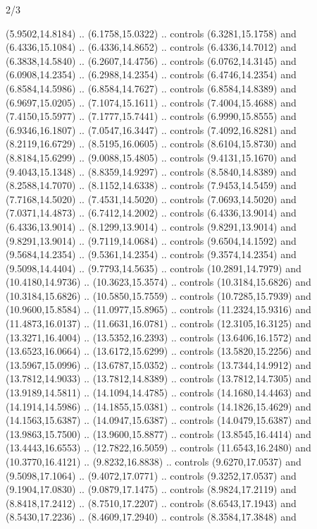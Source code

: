 \begin{flagdescription}{2/3}
\begin{scope}[yshift=\flagwidth,scale=\flagwidth/1241.93737]
\begin{scope}[y=-1mm, x=1mm,draw=gold,fill=blue,line join=miter,miter limit=4,line width=1.8\lw]
{  (5.9502,14.8184) .. (6.1758,15.0322) .. controls (6.3281,15.1758) and
  (6.4336,15.1084) .. (6.4336,14.8652) .. controls (6.4336,14.7012) and
  (6.3838,14.5840) .. (6.2607,14.4756) .. controls (6.0762,14.3145) and
  (6.0908,14.2354) .. (6.2988,14.2354) .. controls (6.4746,14.2354) and
  (6.8584,14.5986) .. (6.8584,14.7627) .. controls (6.8584,14.8389) and
  (6.9697,15.0205) .. (7.1074,15.1611) .. controls (7.4004,15.4688) and
  (7.4150,15.5977) .. (7.1777,15.7441) .. controls (6.9990,15.8555) and
  (6.9346,16.1807) .. (7.0547,16.3447) .. controls (7.4092,16.8281) and
  (8.2119,16.6729) .. (8.5195,16.0605) .. controls (8.6104,15.8730) and
  (8.8184,15.6299) .. (9.0088,15.4805) .. controls (9.4131,15.1670) and
  (9.4043,15.1348) .. (8.8359,14.9297) .. controls (8.5840,14.8389) and
  (8.2588,14.7070) .. (8.1152,14.6338) .. controls (7.9453,14.5459) and
  (7.7168,14.5020) .. (7.4531,14.5020) .. controls (7.0693,14.5020) and
  (7.0371,14.4873) .. (6.7412,14.2002) .. controls (6.4336,13.9014) and
  (6.4336,13.9014) .. (8.1299,13.9014) .. controls (9.8291,13.9014) and
  (9.8291,13.9014) .. (9.7119,14.0684) .. controls (9.6504,14.1592) and
  (9.5684,14.2354) .. (9.5361,14.2354) .. controls (9.3574,14.2354) and
  (9.5098,14.4404) .. (9.7793,14.5635) .. controls (10.2891,14.7979) and
  (10.4180,14.9736) .. (10.3623,15.3574) .. controls (10.3184,15.6826) and
  (10.3184,15.6826) .. (10.5850,15.7559) .. controls (10.7285,15.7939) and
  (10.9600,15.8584) .. (11.0977,15.8965) .. controls (11.2324,15.9316) and
  (11.4873,16.0137) .. (11.6631,16.0781) .. controls (12.3105,16.3125) and
  (13.3271,16.4004) .. (13.5352,16.2393) .. controls (13.6406,16.1572) and
  (13.6523,16.0664) .. (13.6172,15.6299) .. controls (13.5820,15.2256) and
  (13.5967,15.0996) .. (13.6787,15.0352) .. controls (13.7344,14.9912) and
  (13.7812,14.9033) .. (13.7812,14.8389) .. controls (13.7812,14.7305) and
  (13.9189,14.5811) .. (14.1094,14.4785) .. controls (14.1680,14.4463) and
  (14.1914,14.5986) .. (14.1855,15.0381) .. controls (14.1826,15.4629) and
  (14.1563,15.6387) .. (14.0947,15.6387) .. controls (14.0479,15.6387) and
  (13.9863,15.7500) .. (13.9600,15.8877) .. controls (13.8545,16.4414) and
  (13.4443,16.6553) .. (12.7822,16.5059) .. controls (11.6543,16.2480) and
  (10.3770,16.4121) .. (9.8232,16.8838) .. controls (9.6270,17.0537) and
  (9.5098,17.1064) .. (9.4072,17.0771) .. controls (9.3252,17.0537) and
  (9.1904,17.0830) .. (9.0879,17.1475) .. controls (8.9824,17.2119) and
  (8.8418,17.2412) .. (8.7510,17.2207) .. controls (8.6543,17.1943) and
  (8.5430,17.2236) .. (8.4609,17.2940) .. controls (8.3584,17.3848) and
}
\end{scope}
\end{scope}
\end{flagdescription}
